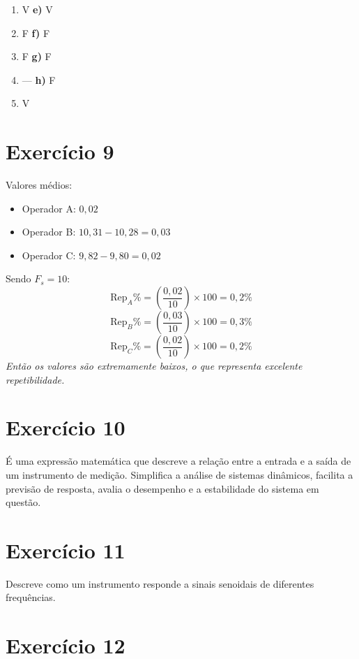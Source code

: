 \begin{enumerate}
    \item[\textbf{a)}] V \quad \textbf{e)} V
    \item[\textbf{b)}] F \quad \textbf{f)} F
    \item[\textbf{c)}] F \quad \textbf{g)} F
    \item[\textbf{d)}] --- \quad \textbf{h)} F
    \item[\textbf{i)}] V
\end{enumerate}

\section*{Exercício 9}

Valores médios:
\begin{itemize}
    \item Operador A: $0{,}02$
    \item Operador B: $10{,}31 - 10{,}28 = 0{,}03$
    \item Operador C: $9{,}82 - 9{,}80 = 0{,}02$
\end{itemize}
Sendo $F_s = 10$:
\[
\text{Rep}_A\% = \left(\frac{0{,}02}{10}\right) \times 100 = 0{,}2\%
\]
\[
\text{Rep}_B\% = \left(\frac{0{,}03}{10}\right) \times 100 = 0{,}3\%
\]
\[
\text{Rep}_C\% = \left(\frac{0{,}02}{10}\right) \times 100 = 0{,}2\%
\]
\textit{Então os valores são extremamente baixos, o que representa excelente repetibilidade.}

\section*{Exercício 10}

É uma expressão matemática que descreve a relação entre a entrada e a saída de um instrumento de medição. Simplifica a análise de sistemas dinâmicos, facilita a previsão de resposta, avalia o desempenho e a estabilidade do sistema em questão.

\section*{Exercício 11}

Descreve como um instrumento responde a sinais senoidais de diferentes frequências.

\section*{Exercício 12}

